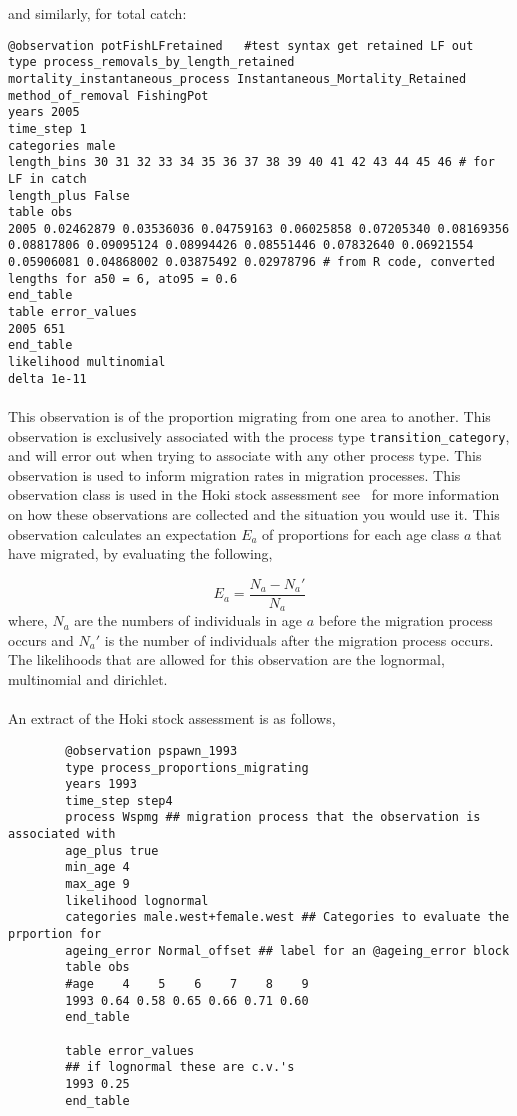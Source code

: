 \begin{itemize}
and similarly, for total catch:

{\small{\begin{verbatim}
@observation potFishLFretained   #test syntax get retained LF out
type process_removals_by_length_retained
mortality_instantaneous_process Instantaneous_Mortality_Retained
method_of_removal FishingPot
years 2005
time_step 1
categories male
length_bins 30 31 32 33 34 35 36 37 38 39 40 41 42 43 44 45 46 # for LF in catch
length_plus False
table obs
2005 0.02462879 0.03536036 0.04759163 0.06025858 0.07205340 0.08169356 0.08817806 0.09095124 0.08994426 0.08551446 0.07832640 0.06921554 0.05906081 0.04868002 0.03875492 0.02978796 # from R code, converted lengths for a50 = 6, ato95 = 0.6
end_table
table error_values
2005 651
end_table
likelihood multinomial
delta 1e-11
\end{verbatim}}}


\paragraph*{\label{sec:Proportions-migrating}}
This observation is of the proportion migrating from one area to another. This observation is exclusively associated with the process type \texttt{transition\_category}, and will error out when trying to associate with any other process type. This observation is used to inform migration rates in migration processes. This observation class is used in the Hoki stock assessment see~\cite{francis_03} for more information on how these observations are collected and the situation you would use it. This observation calculates an expectation $E_a$ of proportions for each age class $a$ that have migrated, by evaluating the following,

\begin{equation}
E_a = \frac{N_a - N_a'}{N_a}
\end{equation}
where, $N_a$ are the numbers of individuals in age $a$ before the migration process occurs and $N_a'$ is the number of individuals after the migration process occurs.
\\
The likelihoods that are allowed for this observation are the lognormal, multinomial and dirichlet.
\\\\
An extract of the Hoki stock assessment is as follows,
{\small{\begin{verbatim}
		@observation pspawn_1993
		type process_proportions_migrating
		years 1993
		time_step step4
		process Wspmg ## migration process that the observation is associated with
		age_plus true
		min_age 4
		max_age 9
		likelihood lognormal
		categories male.west+female.west ## Categories to evaluate the prportion for
		ageing_error Normal_offset ## label for an @ageing_error block
		table obs
		#age    4    5    6    7    8    9
		1993 0.64 0.58 0.65 0.66 0.71 0.60
		end_table
		
		table error_values
		## if lognormal these are c.v.'s
		1993 0.25
		end_table
		\end{verbatim}}}
			
\end{itemize}

